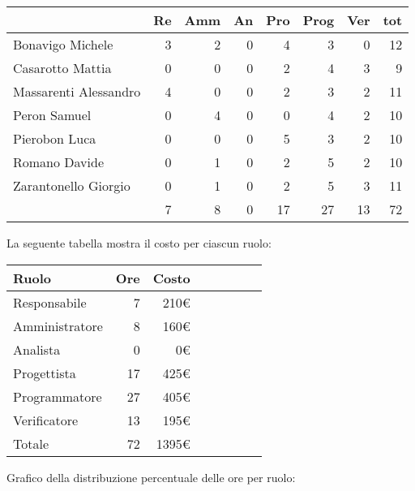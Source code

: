 \begin{table}[H]
    \begin{tabularx}{\linewidth}{X|rrrrrrr}
    \rowcolor{gray!30}& Re & Amm & An & Pro & Prog & Ver & tot \\
    \hline
    Bonavigo Michele                        & 3 & 2 & 0 & 4 & 3 & 0 & 12 \\
    \rowcolor{gray!10}Casarotto Mattia      & 0 & 0 & 0 & 2 & 4 & 3 & 9 \\
    Massarenti Alessandro                   & 4 & 0 & 0 & 2 & 3 & 2 & 11 \\
    \rowcolor{gray!10}Peron Samuel          & 0 & 4 & 0 & 0 & 4 & 2 & 10 \\
    Pierobon Luca                           & 0 & 0 & 0 & 5 & 3 & 2 & 10 \\
    \rowcolor{gray!10}Romano Davide         & 0 & 1 & 0 & 2 & 5 & 2 & 10 \\
    Zarantonello Giorgio                    & 0 & 1 & 0 & 2 & 5 & 3 & 11 \\
    \hline                                  & 7 & 8 & 0 & 17 & 27 & 13 & 72 \\ 
    \end{tabularx}
\end{table}

La seguente tabella mostra il costo per ciascun ruolo:
\begin{table}[H]
    \begin{tabularx}{\linewidth}{X|rrrrrrr}
    \rowcolor{gray!30}Ruolo & Ore & Costo \\
    \hline
    Responsabile                            & 7  & 210€ \\
    \rowcolor{gray!10}Amministratore        & 8  & 160€ \\
    Analista                                & 0  & 0€ \\
    \rowcolor{gray!10}Progettista           & 17  & 425€ \\
    Programmatore                           & 27  & 405€ \\
    \rowcolor{gray!10}Verificatore          & 13  & 195€ \\
    \hline Totale                           & 72  & 1395€ \\ 
    \end{tabularx}
\end{table}

Grafico della distribuzione percentuale delle ore per ruolo:
\begin{center}
\end{center}

